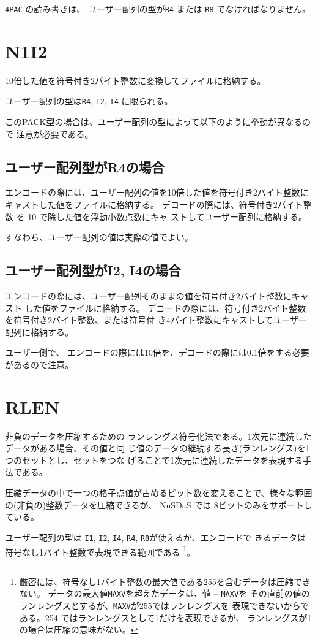 {\tt 4PAC} の読み書きは、
ユーザー配列の型が{\tt R4} または {\tt R8} でなければなりません。

\section{N1I2}

10倍した値を符号付き2バイト整数に変換してファイルに格納する。

ユーザー配列の型は{\tt R4}, {\tt I2}, {\tt I4} に限られる。

このPACK型の場合は、ユーザー配列の型によって以下のように挙動が異なるので
注意が必要である。
\subsection{ユーザー配列型がR4の場合}
エンコードの際には、ユーザー配列の値を10倍した値を符号付き2バイト整数に
キャストした値をファイルに格納する。
デコードの際には、符号付き2バイト整数 を 10 で除した値を浮動小数点数にキャ
ストしてユーザー配列に格納する。

すなわち、ユーザー配列の値は実際の値でよい。

\subsection{ユーザー配列型がI2, I4の場合}
エンコードの際には、ユーザー配列そのままの値を符号付き2バイト整数にキャスト
した値をファイルに格納する。
デコードの際には、符号付き2バイト整数を符号付き2バイト整数、または符号付
き4バイト整数にキャストしてユーザー配列に格納する。

ユーザー側で、
エンコードの際には10倍を、デコードの際には0.1倍をする必要があるので注意。

\section{RLEN}
非負のデータを圧縮するための
ランレングス符号化法である。1次元に連続したデータがある場合、その値と同
じ値のデータの継続する長さ(ランレングス)を1つのセットとし、セットをつな
げることで1次元に連続したデータを表現する手法である。

圧縮データの中で一つの格子点値が占めるビット数を変えることで、様々な範囲
の(非負の)整数データを圧縮できるが、
 NuSDaS では 8ビットのみをサポートしている。

ユーザー配列の型は
{\tt I1}, {\tt I2}, {\tt I4}, {\tt R4}, {\tt R8}が使えるが、エンコードで
きるデータは符号なし1バイト整数で表現できる範囲である%
\footnote{
厳密には、符号なし1バイト整数の最大値である255を含むデータは圧縮できない。
データの最大値{\tt MAXV}を超えたデータは、値 -- {\tt MAXV}を
その直前の値のランレングスとするが、{\tt MAXV}が255ではランレングスを
表現できないからである。254 ではランレングスとして1だけを表現できるが、
ランレングスが1の場合は圧縮の意味がない。
}。

